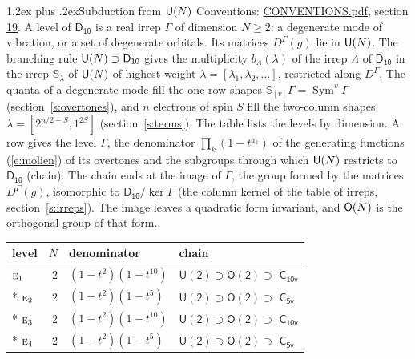 \documentclass[10pt,a4paper]{article}
\makeatletter
\renewcommand\section{\@startsection{section}{1}{\z@}{-3ex plus -1ex minus -.2ex}%
  {1.2ex plus .2ex}{\normalfont\large\sffamily\bfseries\color{parttitle}}}
\numberwithin{equation}{section}
\newcommand{\grp}[1]{\mathsf{#1}}
\newcommand{\irr}[1]{\text{\normalfont\scshape #1}}
\newcommand{\repD}[1]{D^{#1}}
\newcommand{\schur}[1]{\mathbb{S}_{#1}}
\newcommand{\shape}[1]{[#1]}
\makeatother
\begin{document}
\section{Subduction from \texorpdfstring{$\grp{U(\mathnormal{N})}$}{U(N)}}\label{s:unitary}
Conventions: \href{../../CONVENTIONS.pdf}{CONVENTIONS.pdf}, section \href{../../CONVENTIONS.pdf\#conv.19}{19}.
\leavevmode\label{n:local.level.dimension}A level of $\grp{D_{10}}$ is a real irrep $\Gamma$ of dimension $N \ge 2$: a degenerate mode of vibration, or a set of degenerate orbitals. \label{n:group.unitary}Its matrices $\repD{\Gamma}(g)$ lie in $\grp{U(\mathnormal{N})}$. \label{n:irrep.schur}\label{n:shape.partition}\label{n:local.partition}\label{n:function.multiplicity.unitary}The branching rule $\grp{U(\mathnormal{N})} \supset \grp{D_{10}}$ gives the multiplicity $b_\Lambda(\lambda)$ of the irrep $\Lambda$ of $\grp{D_{10}}$ in the irrep $\schur{\lambda}$ of $\grp{U(\mathnormal{N})}$ of highest weight $\lambda = \shape{\lambda_1, \lambda_2, \dots}$, restricted along $\repD{\Gamma}$. \label{n:local.partition.power}\label{n:local.electrons}\label{n:local.spin}The quanta of a degenerate mode fill the one-row shapes $\schur{\shape{v}}\Gamma = \operatorname{Sym}^{v}\Gamma$ (section~\ref{s:overtones}), and $n$ electrons of spin $S$ fill the two-column shapes $\lambda = \shape{2^{n/2-S}, 1^{2S}}$ (section~\ref{s:terms}).
The table lists the levels by dimension. \label{n:head.level}\label{n:head.denominator}\label{n:index.overtone.denominator}\label{n:head.chain}A row gives the level $\Gamma$, the denominator $\prod_k (1 - t^{a_k})$ of the generating functions (\ref{e:molien}) of its overtones and the subgroups through which $\grp{U(\mathnormal{N})}$ restricts to $\grp{D_{10}}$ (chain). The chain ends at the image of $\Gamma$, the group formed by the matrices $\repD{\Gamma}(g)$, isomorphic to $\grp{D_{10}}/\ker\Gamma$ (the column kernel of the table of irreps, section~\ref{s:irreps}). The image leaves a quadratic form invariant, and $\grp{O(\mathnormal{N})}$ is the orthogonal group of that form.
{\small\begin{longtable}{@{}lrll@{}}\toprule
level & $N$ & denominator & chain\\\midrule\endhead
\bottomrule\endfoot\endlastfoot
$\irr{e}_{1}$ & 2 & $(1-t^{2})(1-t^{10})$ & $\grp{U(2)} \supset \grp{O(2)} \supset$ \href{C10v.pdf}{$\grp{C_{10v}}$}\\*
$\irr{e}_{2}$ & 2 & $(1-t^{2})(1-t^{5})$ & $\grp{U(2)} \supset \grp{O(2)} \supset$ \href{C5v.pdf}{$\grp{C_{5v}}$}\\*
$\irr{e}_{3}$ & 2 & $(1-t^{2})(1-t^{10})$ & $\grp{U(2)} \supset \grp{O(2)} \supset$ \href{C10v.pdf}{$\grp{C_{10v}}$}\\*
$\irr{e}_{4}$ & 2 & $(1-t^{2})(1-t^{5})$ & $\grp{U(2)} \supset \grp{O(2)} \supset$ \href{C5v.pdf}{$\grp{C_{5v}}$}\\
\bottomrule\end{longtable}}
\end{document}
